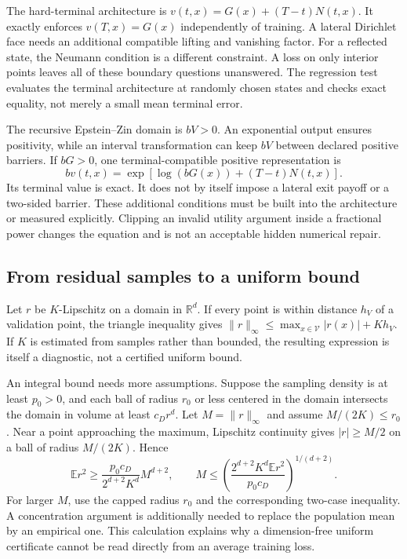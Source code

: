\documentclass[ecta,draft]{econsocart}
\newcommand{\E}{\mathbb E}
\newcommand{\R}{\mathbb R}
\begin{document}
The hard-terminal architecture is $v(t,x)=G(x)+(T-t)N(t,x)$. It exactly enforces $v(T,x)=G(x)$ independently of training. A lateral Dirichlet face needs an additional compatible lifting and vanishing factor. For a reflected state, the Neumann condition is a different constraint. A loss on only interior points leaves all of these boundary questions unanswered. The regression test evaluates the terminal architecture at randomly chosen states and checks exact equality, not merely a small mean terminal error.

The recursive Epstein--Zin domain is $bV>0$. An exponential output ensures positivity, while an interval transformation can keep $bV$ between declared positive barriers. If $bG>0$, one terminal-compatible positive representation is
\[
 bv(t,x)=\exp\left[\log(bG(x))+(T-t)N(t,x)\right].
\]
Its terminal value is exact. It does not by itself impose a lateral exit payoff or a two-sided barrier. These additional conditions must be built into the architecture or measured explicitly. Clipping an invalid utility argument inside a fractional power changes the equation and is not an acceptable hidden numerical repair.

\subsection{From residual samples to a uniform bound}
Let $r$ be $K$-Lipschitz on a domain in $\R^d$. If every point is within distance $h_V$ of a validation point, the triangle inequality gives $\|r\|_\infty\leq\max_{x\in\mathcal V}|r(x)|+Kh_V$. If $K$ is estimated from samples rather than bounded, the resulting expression is itself a diagnostic, not a certified uniform bound.

An integral bound needs more assumptions. Suppose the sampling density is at least $p_0>0$, and each ball of radius $r_0$ or less centered in the domain intersects the domain in volume at least $c_Dr^d$. Let $M=\|r\|_\infty$ and assume $M/(2K)\leq r_0$. Near a point approaching the maximum, Lipschitz continuity gives $|r|\geq M/2$ on a ball of radius $M/(2K)$. Hence
\[
 \E r^2\geq\frac{p_0c_D}{2^{d+2}K^d}M^{d+2},\qquad
 M\leq\left(\frac{2^{d+2}K^d\E r^2}{p_0c_D}\right)^{1/(d+2)}.
\]
For larger $M$, use the capped radius $r_0$ and the corresponding two-case inequality. A concentration argument is additionally needed to replace the population mean by an empirical one. This calculation explains why a dimension-free uniform certificate cannot be read directly from an average training loss.
\end{document}
